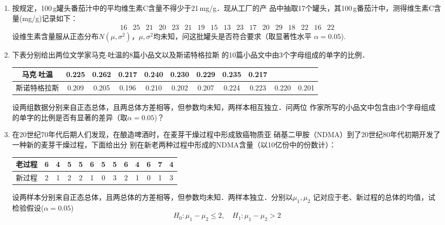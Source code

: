 \documentclass[10pt,a4paper]{article}
\begin{document}
\begin{enumerate}
    \item 按规定，100$\, $g罐头番茄汁中的平均维生素C含量不得少于21$\, $mg/g．现从工厂的产
    品中抽取17个罐头，其100$\, $g番茄汁中，测得维生素C含量(mg/g)记录如下：
    $$\begin{array}{ccccccccccccccccc}
        16 & 25 &  21 & 20 & 23 & 21 & 19 & 15 & 13 & 23 & 17 & 20 & 29 & 18 & 22 & 16 &  22
    \end{array}$$
    设维生素含量服从正态分布$N(\mu,\sigma^2)$，$\mu,\sigma^2$均未知，问这批罐头是否符合要求（取显著性水平
    $\alpha=0.05$).





    \item 下表分别给出两位文学家马克$\cdot$吐温的8篇小品文以及斯诺特格拉斯
    的10篇小品文中由3个字母组成的单字的比例．
    \renewcommand{\arraystretch}{1.3}
    \begin{table}[H]\centering
        \begin{tabular}{c|cccccccccc}
        马克$\cdot$吐温 & 0.225 & 0.262 & 0.217 & 0.240 & 0.230 & 0.229 & 0.235 & 0.217 &  &  \\ \hline
        斯诺特格拉斯 & 0.209 & 0.205 & 0.196 & 0.210 & 0.202 & 0.207 & 0.224 & 0.223 & 0.220 & 0.201
    \end{tabular}
    \end{table}
    \renewcommand{\arraystretch}{1.0}
    设两组数据分别来自正态总体，且两总体方差相等，但参数均未知，两样本相互独立．问两位
    作家所写的小品文中包含由3个字母组成的单字的比例是否有显著的差异（取$\alpha=0.05$)？




    \item 在20世纪70年代后期人们发现，在酿造啤酒时，在麦芽干燥过程中形成致癌物质亚
    硝基二甲胺（NDMA）到了20世纪80年代初期开发了一种新的麦芽干燥过程，下面给出分
    别在新老两种过程中形成的NDMA含量（以10亿份中的份数计）：
    \renewcommand{\arraystretch}{1.3}
    \begin{table}[H]\centering
    \begin{tabular}{c|cccccccccccc}
    老过程 & 6 & 4 & 5 & 5 & 6 & 5 & 5 & 6 & 4 & 6 & 7 & 4 \\ \hline
    新过程 & 2 & 1 & 2 & 2 & 1 & 0 & 3 & 2 & 1 & 0 & 1 & 3
    \end{tabular}
    \end{table}
    \renewcommand{\arraystretch}{1.0}
    设两样本分别来自正态总体，且两总体的方差相等，但参数均未知．两样本独立．分别以$\mu_1,\mu_2$
    记对应于老、新过程的总体的均值，试检验假设($\alpha=0.05$)
    $$H_0:\mu_1-\mu_2\leq 2,\quad H_1:\mu_1-\mu_2>2$$





\end{enumerate}
\end{document}
